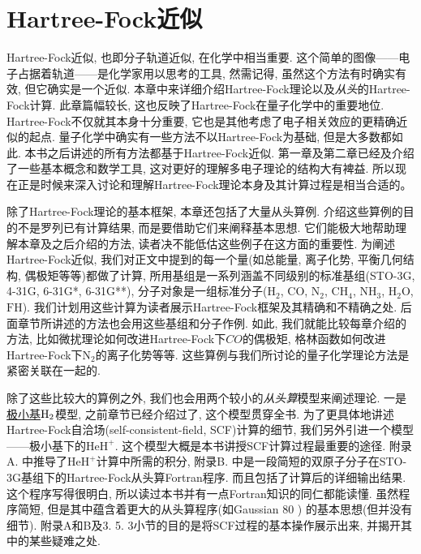 \chapter{Hartree-Fock近似}
\label{ch:3}
Hartree-Fock近似, 也即分子轨道近似, 在化学中相当重要. 
这个简单的图像——电子占据着轨道——是化学家用以思考的工具, 
然需记得, 虽然这个方法有时确实有效, 但它确实是一个近似. 
本章中来详细介绍Hartree-Fock理论以及\emph{从头}的Hartree-Fock计算. 
此章篇幅较长, 这也反映了Hartree-Fock在量子化学中的重要地位. 
Hartree-Fock不仅就其本身十分重要, 它也是其他考虑了电子相关效应的更精确近似的起点. 
量子化学中确实有一些方法不以Hartree-Fock为基础, 但是大多数都如此. 
本书之后讲述的所有方法都基于Hartree-Fock近似. 
第一章及第二章已经及介绍了一些基本概念和数学工具, 这对更好的理解多电子理论的结构大有裨益. 所以现在正是时候来深入讨论和理解Hartree-Fock理论本身及其计算过程是相当合适的。

除了Hartree-Fock理论的基本框架, 
本章还包括了大量从头算例.
介绍这些算例的目的不是罗列已有计算结果, 
而是要借助它们来阐释基本思想. 
它们能极大地帮助理解本章及之后介绍的方法, 
读者决不能低估这些例子在这方面的重要性. 
为阐述Hartree-Fock近似, 
我们对正文中提到的每一个量(如总能量, 
离子化势, 
平衡几何结构, 
偶极矩等等)都做了计算, 
所用基组是一系列涵盖不同级别的标准基组(STO-3G, 
4-31G, 
6-31G*, 
6-31G**), 
分子对象是一组标准分子($\mathrm{H}_2$, 
$\mathrm{CO}$, 
$\mathrm{N}_2$, 
$\mathrm{CH}_4$, 
$\mathrm{NH}_3$, 
$\mathrm{H}_2\mathrm{O}$, 
$\mathrm{FH}$). 
我们计划用这些计算为读者展示Hartree-Fock框架及其精确和不精确之处. 
后面章节所讲述的方法也会用这些基组和分子作例. 
如此, 
我们就能比较每章介绍的方法, 
比如微扰理论如何改进Hartree-Fock下$CO$的偶极矩, 
格林函数如何改进Hartree-Fock下$\mathrm{N}_2$的离子化势等等. 
这些算例与我们所讨论的量子化学理论方法是紧密关联在一起的.


除了这些比较大的算例之外, 
我们也会用两个较小的\emph{从头算}模型来阐述理论. 
一是\underline{极小基$\mathrm{H}_2$}模型, 
之前章节已经介绍过了, 
这个模型贯穿全书. 
为了更具体地讲述Hartree-Fock自洽场(self-consistent-field, 
SCF)计算的细节, 
我们另外引进一个模型——极小基下的$\mathrm{HeH}^+$. 
这个模型大概是本书讲授SCF计算过程最重要的途径. 
附录A.
中推导了$\mathrm{HeH}^+$计算中所需的积分, 
附录B.
中是一段简短的双原子分子在STO-3G基组下的Hartree-Fock从头算Fortran程序. 
而且包括了计算后的详细输出结果. 
这个程序写得很明白, 
所以读过本书并有一点Fortran知识的同仁都能读懂. 
虽然程序简短, 
但是其中蕴含着更大的从头算程序(如Gaussian 80
)
的基本思想(但并没有细节). 
附录A和B及3.
5.
3小节的目的是将SCF过程的基本操作展示出来, 
并揭开其中的某些疑难之处.


